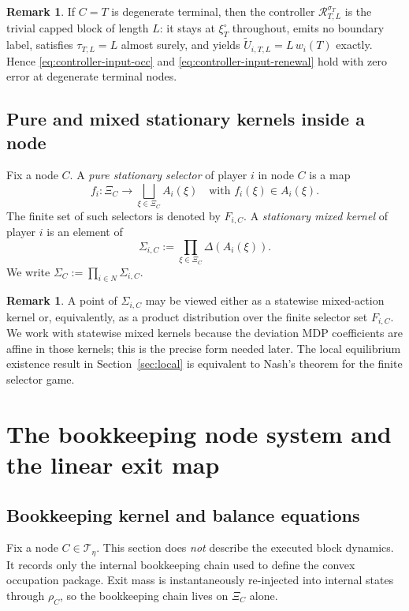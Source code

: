 \documentclass[12pt]{article}
\theoremstyle{definition}
\newtheorem{remark}[theorem]{Remark}
\newcommand{\1}{\mathbf{1}}
\newcommand{\cT}{\mathcal{T}}
\begin{document}
\begin{remark}
If $C=T$ is degenerate terminal, then the controller
$\mathcal R_{T,L}^{\sigma_T}$ is the trivial capped block of length $L$: it stays
at $\xi_T^\circ$ throughout, emits no boundary label, satisfies
$\tau_{T,L}=L$ almost surely, and yields
$\widetilde U_{i,T,L}=L\,w_i(T)$ exactly. Hence
\eqref{eq:controller-input-occ} and \eqref{eq:controller-input-renewal} hold with
zero error at degenerate terminal nodes.
\end{remark}

\subsection{Pure and mixed stationary kernels inside a node}

Fix a node $C$. A \emph{pure stationary selector} of player $i$ in node $C$ is a
map
\[
f_i: \Xi_C\to \bigsqcup_{\xi\in\Xi_C}A_i(\xi)
\quad\text{with }f_i(\xi)\in A_i(\xi).
\]
The finite set of such selectors is denoted by $F_{i,C}$. A \emph{stationary
mixed kernel} of player $i$ is an element of
\[
\Sigma_{i,C}:=\prod_{\xi\in\Xi_C}\Delta(A_i(\xi)).
\]
We write $\Sigma_C:=\prod_{i\in N}\Sigma_{i,C}$.

\begin{remark}
A point of $\Sigma_{i,C}$ may be viewed either as a statewise mixed-action kernel
or, equivalently, as a product distribution over the finite selector set
$F_{i,C}$. We work with statewise mixed kernels because the deviation MDP
coefficients are affine in those kernels; this is the precise form needed later.
The local equilibrium existence result in Section~\ref{sec:local} is equivalent to
Nash's theorem for the finite selector game.
\end{remark}

\section{The bookkeeping node system and the linear exit map}
\label{sec:bookkeeping}

\subsection{Bookkeeping kernel and balance equations}

Fix a node $C\in\cT_\eta$. This section does \emph{not} describe the executed
block dynamics. It records only the internal bookkeeping chain used to define the
convex occupation package. Exit mass is instantaneously re-injected into internal
states through $\rho_C$, so the bookkeeping chain lives on $\Xi_C$ alone.
\end{document}
